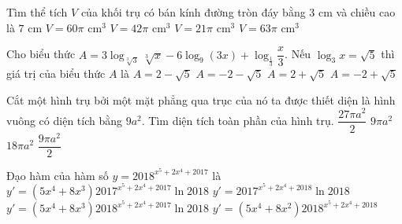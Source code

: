 \begin{ex}%
	Tìm thể tích $V$ của khối trụ có bán kính đường tròn đáy bằng $3\text{ cm}$ và chiều cao là $7\text{ cm}$
	\choice
	{$V=60\pi \text{ cm}^3$}
	{$V=42\pi \text{ cm}^3$}
	{$V=21\pi \text{ cm}^3$}
	{\True $V=63\pi \text{ cm}^3$}
\end{ex}



\begin{ex}%
	Cho biểu thức $A=3\log_{\sqrt[3]{3}}\sqrt[3]{x}-6\log_9(3x)+\log_{\frac{1}{3}}\dfrac{x}{3}$. Nếu $\log_3x=\sqrt{5}$ thì giá trị của biểu thức $A$ là
	\choice
	{$A=2-\sqrt{5}$}
	{\True $A=-2-\sqrt{5}$}
	{$A=2+\sqrt{5}$}
	{$A=-2+\sqrt{5}$}
\end{ex}



\begin{ex}%
	Cắt một hình trụ bởi một mặt phẳng qua trục của nó ta được thiết diện là hình vuông có diện tích bằng $9a^2$. Tìm diện tích toàn phần của hình trụ.
	\choice
	{\True $\dfrac{27\pi a^2}{2}$}
	{$9\pi a^2$}
	{$18\pi a^2$}
	{$\dfrac{9\pi a^2}{2}$}
\end{ex}




\begin{ex}%
	Đạo hàm của hàm số $y=2018^{x^5+2x^4+2017}$ là
	\choice
	{$y'=(5x^4+8x^3)2017^{x^5+2x^4+2017}\ln 2018$}
	{$y'=2017^{x^5+2x^4+2018}\ln 2018$}
	{\True $y'=(5x^4+8x^3)2018^{x^5+2x^4+2017}\ln 2018$}
	{$y'=(5x^4+8x^2)2018^{x^5+2x^4+2018}$}
\end{ex}



